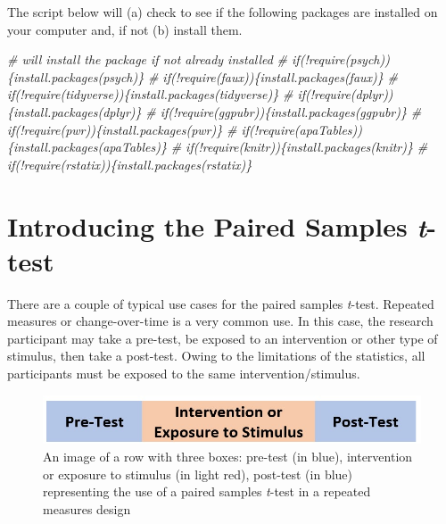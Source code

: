 \documentclass[
  11pt,
]{book}
\newenvironment{Shaded}{\begin{snugshade}}{\end{snugshade}}
\newcommand{\CommentTok}[1]{\textcolor[rgb]{0.37,0.37,0.37}{\textit{#1}}}
\begin{document}
The script below will (a) check to see if the following packages are installed on your computer and, if not (b) install them.

\begin{Shaded}
\begin{Highlighting}[]
\CommentTok{\# will install the package if not already installed}
\CommentTok{\# if(!require(psych))\{install.packages(\textquotesingle{}psych\textquotesingle{})\}}
\CommentTok{\# if(!require(faux))\{install.packages(\textquotesingle{}faux\textquotesingle{})\}}
\CommentTok{\# if(!require(tidyverse))\{install.packages(\textquotesingle{}tidyverse\textquotesingle{})\}}
\CommentTok{\# if(!require(dplyr))\{install.packages(\textquotesingle{}dplyr\textquotesingle{})\}}
\CommentTok{\# if(!require(ggpubr))\{install.packages(\textquotesingle{}ggpubr\textquotesingle{})\}}
\CommentTok{\# if(!require(pwr))\{install.packages(\textquotesingle{}pwr\textquotesingle{})\}}
\CommentTok{\# if(!require(apaTables))\{install.packages(\textquotesingle{}apaTables\textquotesingle{})\}}
\CommentTok{\# if(!require(knitr))\{install.packages(\textquotesingle{}knitr\textquotesingle{})\}}
\CommentTok{\# if(!require(rstatix))\{install.packages(\textquotesingle{}rstatix\textquotesingle{})\}}
\end{Highlighting}
\end{Shaded}

\hypertarget{introducing-the-paired-samples-t-test}{%
\section{\texorpdfstring{Introducing the Paired Samples \emph{t}-test}{Introducing the Paired Samples t-test}}\label{introducing-the-paired-samples-t-test}}

There are a couple of typical use cases for the paired samples \emph{t}-test. Repeated measures or change-over-time is a very common use. In this case, the research participant may take a pre-test, be exposed to an intervention or other type of stimulus, then take a post-test. Owing to the limitations of the statistics, all participants must be exposed to the same intervention/stimulus.

\begin{figure}
\centering
\includegraphics{images/ttests/prepost_paired.jpg}
\caption{An image of a row with three boxes: pre-test (in blue), intervention or exposure to stimulus (in light red), post-test (in blue) representing the use of a paired samples \emph{t}-test in a repeated measures design}
\end{figure}
\end{document}
